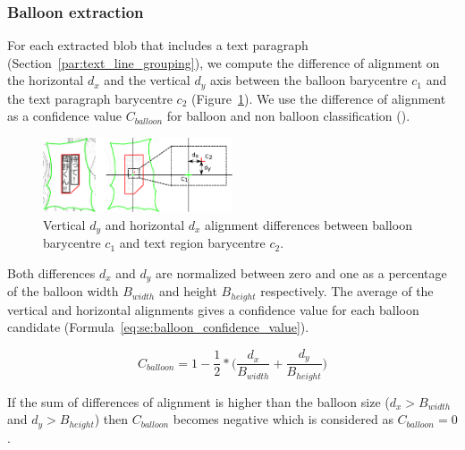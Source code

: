 

\subsubsection{Balloon extraction} %
\label{par:balloon_extraction}

For each extracted blob that includes a text paragraph (Section~\ref{par:text_line_grouping}), we compute the difference of alignment on the horizontal $d_x$ and the vertical $d_y$ axis between the balloon barycentre $c_1$ and the text paragraph barycentre $c_2$ (Figure~\ref{fig:se:align_diff}).
We use the difference of alignment as a confidence value $C_{balloon}$ for balloon and non balloon classification ().

	\begin{figure}[h!]	%
	  \centering
		\includegraphics[trim= 140px 0px 0px 0px, clip, width=0.5\textwidth]{text_balloon_alignment.pdf}
		\caption[Illustration of the vertical and horizontal alignment differences between balloon and text region barycentre]{Vertical $d_y$ and horizontal $d_x$ alignment differences between balloon barycentre $c_1$ and text region barycentre $c_2$.}
		\label{fig:se:align_diff}
	\end{figure}

Both differences $d_x$ and $d_y$ are normalized between zero and one as a percentage of the balloon width $B_{width}$ and height $B_{height}$ respectively.
The average of the vertical and horizontal alignments gives a confidence value for each balloon candidate (Formula~\ref{eq:se:balloon_confidence_value}).


\begin{equation}
	\label{eq:se:balloon_confidence_value}
	C_{balloon} = 1 - \frac{1}{2} *  \bigg( \frac{d_x}{B_{width}} + \frac{d_y}{B_{height}} \bigg)
\end{equation}

If the sum of differences of alignment is higher than the balloon size ($d_x > B_{width}$ and $d_y > B_{height}$) then $C_{balloon}$ becomes negative which is considered as $C_{balloon}=0$.





